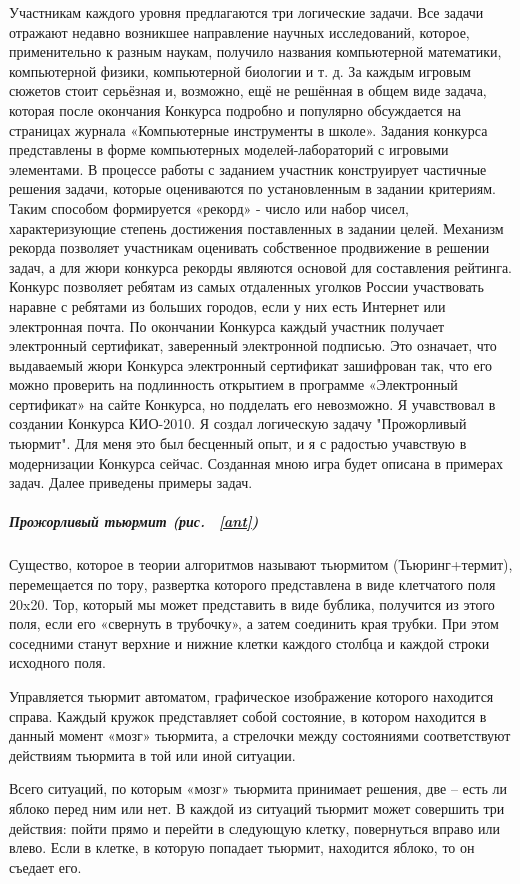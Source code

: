 Участникам каждого уровня предлагаются три логические задачи. Все задачи отражают недавно возникшее направление научных исследований, которое, применительно к разным наукам, получило названия компьютерной математики, компьютерной физики, компьютерной биологии и т. д. За каждым игровым сюжетов стоит серьёзная и, возможно, ещё не решённая в общем виде задача, которая после окончания Конкурса подробно и популярно обсуждается на страницах журнала «Компьютерные инструменты в школе».
Задания конкурса представлены в форме компьютерных моделей-лабораторий с игровыми элементами. В процессе работы с заданием участник конструирует частичные решения задачи, которые оцениваются по установленным в задании критериям. Таким способом формируется «рекорд» - число или набор чисел, характеризующие степень достижения поставленных в задании целей. Механизм рекорда позволяет участникам оценивать собственное продвижение в решении задач, а для жюри конкурса рекорды являются основой для составления рейтинга. 
Конкурс позволяет ребятам из самых отдаленных уголков России участвовать наравне с ребятами из больших городов, если у них есть Интернет или электронная почта. 
По окончании Конкурса каждый участник получает электронный сертификат, заверенный электронной подписью. Это означает, что выдаваемый жюри Конкурса электронный сертификат зашифрован так, что его можно проверить на подлинность открытием в программе «Электронный сертификат» на сайте Конкурса, но подделать его невозможно.
Я учавствовал в создании Конкурса КИО-2010. Я создал логическую задачу "Прожорливый тьюрмит". Для меня это был бесценный опыт, и я с радостью учавствую в модернизации Конкурса сейчас. Созданная мною игра будет описана в примерах задач.
Далее приведены примеры задач.
\subparagraph{Прожорливый тьюрмит (рис. ~\ref{ant})}
Существо, которое в теории алгоритмов называют тьюрмитом (Тьюринг+термит), перемещается по тору, развертка которого представлена в виде клетчатого поля 20x20. Тор, который мы может представить в виде бублика, получится из этого поля, если его «свернуть в трубочку», а затем соединить края трубки. При этом соседними станут верхние и нижние клетки каждого столбца и каждой строки исходного поля.

Управляется тьюрмит автоматом, графическое  изображение которого находится справа. Каждый кружок представляет собой состояние, в котором находится в данный момент «мозг» тьюрмита, а стрелочки между состояниями соответствуют действиям тьюрмита в той или иной ситуации.

Всего ситуаций, по которым «мозг» тьюрмита принимает решения, две – есть ли яблоко перед ним или нет. В каждой из ситуаций тьюрмит может совершить три действия: пойти прямо и перейти в следующую клетку, повернуться вправо или влево. Если в клетке, в которую попадает тьюрмит, находится яблоко, то он съедает его.

